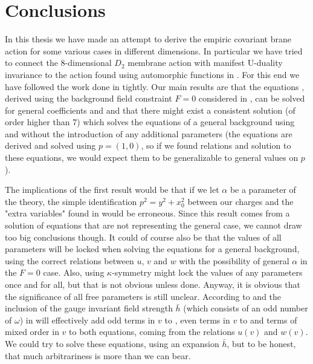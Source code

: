 \chapter{Conclusions}
In this thesis we have made an attempt to derive the empiric covariant brane action  for some various cases in different dimensions. 
In particular we have tried to connect the 8-dimensional $D_2$ membrane action with manifest U-duality invariance to the action found using automorphic functions in \cite{pioline}. For this end we have followed the work done in \cite{artikeln} tightly.
Our main results are that the equations , derived using the background field constraint $F=0$ considered in \cite{artikeln}, can be solved for general coefficients  and  and that there might exist a consistent solution (of order higher than 7) which solves the equations  of a general background using  and  without the introduction of any additional parameters (the equations are derived and solved using $p=(1,0)$, so if we found relations and solution to these equations, we would expect them to be generalizable to general values on $p$).  

The implications of the first result would be that if we let $\alpha$ be a parameter of the theory, the simple identification $p^2 = y^2+x_0^2$ between our charges and the "extra variables" found in \cite{pioline} would be erroneous.  
Since this result comes from a solution of equations that are not representing the general case, we cannot draw too big conclusions though. It could of course also be that the values of all parameters will be locked when solving the equations for a general background, using the correct relations between $u$, $v$ and $w$ with the possibility of general $\alpha$ in the $F=0$ case.
Also, using $\kappa$-symmetry might lock the values of any parameters once and for all, but that is not obvious unless done.
Anyway, it is obvious that the significance of all free parameters is still unclear.
According to  and  the inclusion of the gauge invariant field strength $\bar h$ (which consists of an odd number of $\omega$) in  will effectively add odd terms in $v$ to , even terms in $v$ to  and terms of mixed order in $v$ to both equations, coming from the relations $u(v)$ and $w(v)$.   
We could try to solve these equations, using an expansion $\bar h$, but to be honest, that much arbitrariness is more than we can bear.

